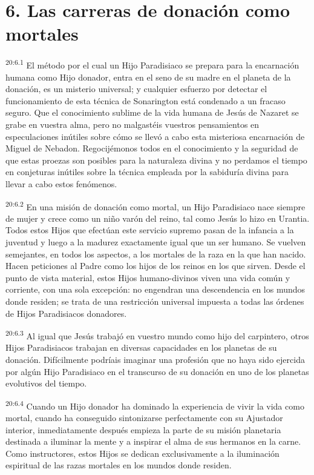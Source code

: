 \section*{6. Las carreras de donación como mortales}
\par
\textsuperscript{20:6.1} El método por el cual un Hijo Paradisiaco se prepara para la encarnación humana como Hijo donador, entra en el seno de su madre en el planeta de la donación, es un misterio universal; y cualquier esfuerzo por detectar el funcionamiento de esta técnica de Sonarington está condenado a un fracaso seguro. Que el conocimiento sublime de la vida humana de Jesús de Nazaret se grabe en vuestra alma, pero no malgastéis vuestros pensamientos en especulaciones inútiles sobre cómo se llevó a cabo esta misteriosa encarnación de Miguel de Nebadon. Regocijémonos todos en el conocimiento y la seguridad de que estas proezas son posibles para la naturaleza divina y no perdamos el tiempo en conjeturas inútiles sobre la técnica empleada por la sabiduría divina para llevar a cabo estos fenómenos.

\par
\textsuperscript{20:6.2} En una misión de donación como mortal, un Hijo Paradisiaco nace siempre de mujer y crece como un niño varón del reino, tal como Jesús lo hizo en Urantia. Todos estos Hijos que efectúan este servicio supremo pasan de la infancia a la juventud y luego a la madurez exactamente igual que un ser humano. Se vuelven semejantes, en todos los aspectos, a los mortales de la raza en la que han nacido. Hacen peticiones al Padre como los hijos de los reinos en los que sirven. Desde el punto de vista material, estos Hijos humano-divinos viven una vida común y corriente, con una sola excepción: no engendran una descendencia en los mundos donde residen; se trata de una restricción universal impuesta a todas las órdenes de Hijos Paradisiacos donadores.

\par
\textsuperscript{20:6.3} Al igual que Jesús trabajó en vuestro mundo como hijo del carpintero, otros Hijos Paradisiacos trabajan en diversas capacidades en los planetas de su donación. Difícilmente podríais imaginar una profesión que no haya sido ejercida por algún Hijo Paradisiaco en el transcurso de su donación en uno de los planetas evolutivos del tiempo.

\par
\textsuperscript{20:6.4} Cuando un Hijo donador ha dominado la experiencia de vivir la vida como mortal, cuando ha conseguido sintonizarse perfectamente con su Ajustador interior, inmediatamente después empieza la parte de su misión planetaria destinada a iluminar la mente y a inspirar el alma de sus hermanos en la carne. Como instructores, estos Hijos se dedican exclusivamente a la iluminación espiritual de las razas mortales en los mundos donde residen.

